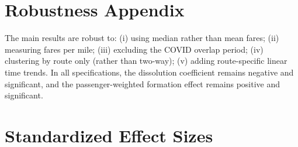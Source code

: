 \documentclass[12pt]{article}
\begin{document}
\section{Robustness Appendix}

The main results are robust to: (i) using median rather than mean fares; (ii) measuring fares per mile; (iii) excluding the COVID overlap period; (iv) clustering by route only (rather than two-way); (v) adding route-specific linear time trends. In all specifications, the dissolution coefficient remains negative and significant, and the passenger-weighted formation effect remains positive and significant.


\section{Standardized Effect Sizes}
\label{sec:sde}


\end{document}

